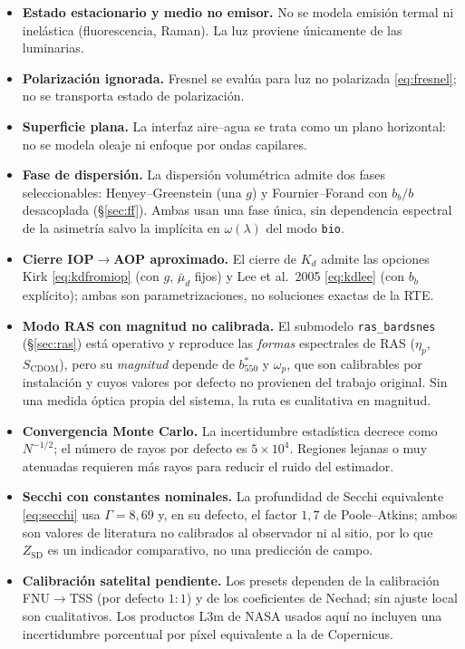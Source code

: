 \documentclass[11pt,a4paper]{article}
\newcommand{\code}[1]{\texttt{#1}}
\begin{document}
\begin{itemize}[itemsep=3pt]
  \item \textbf{Estado estacionario y medio no emisor.} No se modela emisión
  termal ni inelástica (fluorescencia, Raman). La luz proviene únicamente de las
  luminarias.
  \item \textbf{Polarización ignorada.} Fresnel se evalúa para luz no polarizada
  \eqref{eq:fresnel}; no se transporta estado de polarización.
  \item \textbf{Superficie plana.} La interfaz aire--agua se trata como un plano
  horizontal: no se modela oleaje ni enfoque por ondas capilares.
  \item \textbf{Fase de dispersión.} La dispersión volumétrica admite dos fases
  seleccionables: Henyey--Greenstein (una $g$) y Fournier--Forand con $b_b/b$
  desacoplada (\S\ref{sec:ff}). Ambas usan una fase única, sin dependencia espectral
  de la asimetría salvo la implícita en $\omega(\lambda)$ del modo \code{bio}.
  \item \textbf{Cierre IOP$\to$AOP aproximado.} El cierre de $K_d$ admite las
  opciones Kirk \eqref{eq:kdfromiop} (con $g$, $\bar\mu_d$ fijos) y Lee et al.\ 2005
  \eqref{eq:kdlee} (con $b_b$ explícito); ambas son parametrizaciones, no soluciones
  exactas de la RTE.
  \item \textbf{Modo RAS con magnitud no calibrada.} El submodelo
  \code{ras\_bardsnes} (\S\ref{sec:ras}) está operativo y reproduce las
  \emph{formas} espectrales de RAS ($\eta_p$, $S_\text{CDOM}$), pero su
  \emph{magnitud} depende de $b^{*}_{550}$ y $\omega_p$, que son calibrables por
  instalación y cuyos valores por defecto no provienen del trabajo original. Sin una
  medida óptica propia del sistema, la ruta es cualitativa en magnitud.
  \item \textbf{Convergencia Monte Carlo.} La incertidumbre estadística decrece como
  $N^{-1/2}$; el número de rayos por defecto es $5\times10^4$. Regiones lejanas o
  muy atenuadas requieren más rayos para reducir el ruido del estimador.
  \item \textbf{Secchi con constantes nominales.} La profundidad de Secchi
  equivalente \eqref{eq:secchi} usa $\Gamma=8{,}69$ y, en su defecto, el factor
  $1{,}7$ de Poole--Atkins; ambos son valores de literatura no calibrados al
  observador ni al sitio, por lo que $Z_\text{SD}$ es un indicador comparativo, no
  una predicción de campo.
  \item \textbf{Calibración satelital pendiente.} Los presets dependen de la
  calibración FNU$\to$TSS (por defecto $1{:}1$) y de los coeficientes de Nechad; sin
  ajuste local son cualitativos. Los productos L3m de NASA usados aquí no incluyen
  una incertidumbre porcentual por píxel equivalente a la de Copernicus.
\end{itemize}
\end{document}
